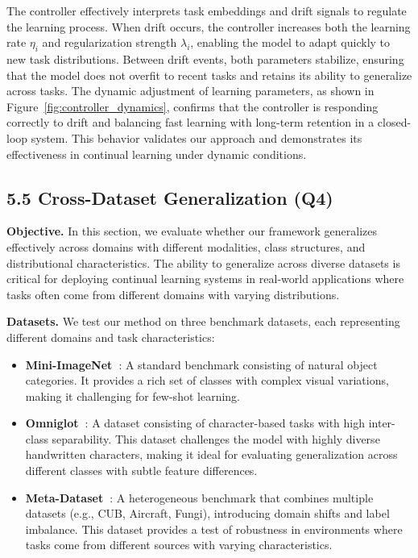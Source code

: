 \documentclass[conference]{IEEEtran}
\begin{document}
The controller effectively interprets task embeddings and drift signals to regulate the learning process. When drift occurs, the controller increases both the learning rate $\eta_i$ and regularization strength $\lambda_i$, enabling the model to adapt quickly to new task distributions. Between drift events, both parameters stabilize, ensuring that the model does not overfit to recent tasks and retains its ability to generalize across tasks. The dynamic adjustment of learning parameters, as shown in Figure~\ref{fig:controller_dynamics}, confirms that the controller is responding correctly to drift and balancing fast learning with long-term retention in a closed-loop system. This behavior validates our approach and demonstrates its effectiveness in continual learning under dynamic conditions.



\subsection{5.5 Cross-Dataset Generalization (Q4)}

\textbf{Objective.}  
In this section, we evaluate whether our framework generalizes effectively across domains with different modalities, class structures, and distributional characteristics. The ability to generalize across diverse datasets is critical for deploying continual learning systems in real-world applications where tasks often come from different domains with varying distributions.

\textbf{Datasets.}  
We test our method on three benchmark datasets, each representing different domains and task characteristics:
\begin{itemize}
    \item \textbf{Mini-ImageNet~\cite{vinyals2016matching}}: A standard benchmark consisting of natural object categories. It provides a rich set of classes with complex visual variations, making it challenging for few-shot learning.
    \item \textbf{Omniglot~\cite{lake2015human}}: A dataset consisting of character-based tasks with high inter-class separability. This dataset challenges the model with highly diverse handwritten characters, making it ideal for evaluating generalization across different classes with subtle feature differences.
    \item \textbf{Meta-Dataset~\cite{triantafillou2019meta}}: A heterogeneous benchmark that combines multiple datasets (e.g., CUB, Aircraft, Fungi), introducing domain shifts and label imbalance. This dataset provides a test of robustness in environments where tasks come from different sources with varying characteristics.
\end{itemize}
\end{document}
